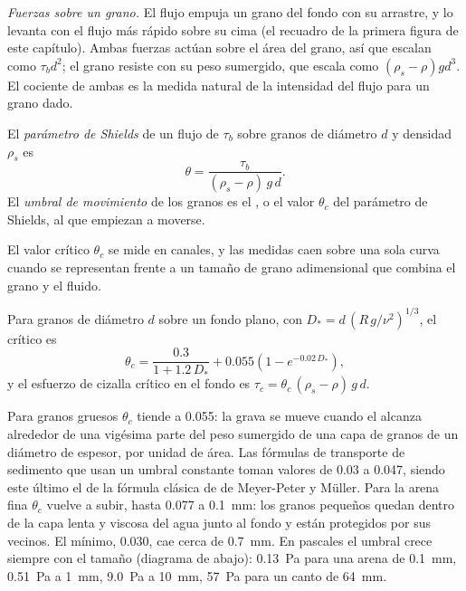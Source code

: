 \emph{Fuerzas sobre un grano.} El flujo empuja un grano del fondo con su arrastre, y lo levanta con el flujo más rápido sobre su cima (el recuadro
de la primera figura de este capítulo). Ambas fuerzas actúan sobre el área del grano, así que escalan como $\tau_b
d^2$; el grano resiste con su peso sumergido, que escala como
$(\rho_s - \rho) g d^3$. El cociente de ambas es la medida natural de la intensidad del flujo para un grano dado.

\begin{definition}\label{def:b1:erosion-transport:threshold}
El \emph{parámetro de Shields} de un flujo de  $\tau_b$ sobre granos de diámetro $d$ y densidad $\rho_s$ es
\[
  \theta = \frac{\tau_b}{(\rho_s - \rho)\,g\,d}.
\]
El \emph{umbral de movimiento} de los granos es el , o el valor $\theta_c$ del parámetro de Shields,
al que empiezan a moverse.
\end{definition}

El valor crítico $\theta_c$ se mide en canales, y las medidas caen sobre una sola curva cuando se representan frente a un tamaño de grano adimensional que combina el grano y el fluido.

\begin{proposition}\label{prop:b1:erosion-transport:soulsby}
Para granos de diámetro $d$ sobre un fondo plano, con
$D_* = d\,\left(R\,g/\nu^2\right)^{1/3}$, el  crítico es
\[
  \theta_c = \frac{0.3}{1 + 1.2\,D_*} + 0.055\left(1 - e^{-0.02\,D_*}\right),
\]
y el esfuerzo de cizalla crítico en el fondo es $\tau_c = \theta_c\,(\rho_s - \rho)\,g\,d$.
\end{proposition}
\admitted

Para granos gruesos $\theta_c$ tiende a \num{0.055}: la grava se mueve cuando el  alcanza alrededor de una vigésima
parte del peso sumergido de una capa de granos de un diámetro de espesor, por unidad de área. Las fórmulas de transporte de sedimento que usan un
umbral constante toman valores de \num{0.03} a \num{0.047}, siendo este último el de la fórmula clásica de  de Meyer-Peter y Müller.
Para la arena fina $\theta_c$ vuelve a subir, hasta \num{0.077} a \qty{0.1}{mm}: los granos pequeños quedan dentro de la capa lenta y viscosa del agua
junto al fondo y están protegidos por sus vecinos. El mínimo, \num{0.030}, cae cerca de \qty{0.7}{mm}. En pascales el umbral crece siempre con el tamaño
(diagrama de abajo): \qty{0.13}{Pa} para una arena de \qty{0.1}{mm}, \qty{0.51}{Pa} a \qty{1}{mm}, \qty{9.0}{Pa} a \qty{10}{mm}, \qty{57}{Pa} para un
canto de \qty{64}{mm}.

